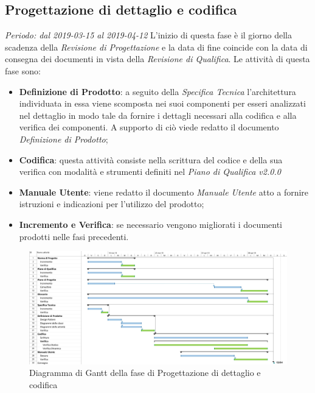 \subsection{Progettazione di dettaglio e codifica}
\textit{Periodo: dal 2019-03-15 al 2019-04-12}
L'inizio di questa fase è il giorno della scadenza della \textit{Revisione di 
Progettazione} e la data di fine coincide con la data di consegna dei documenti 
in vista della \textit{Revisione di Qualifica}. Le attività di questa fase sono:
\begin{itemize}
	\item \textbf{Definizione di Prodotto}: a seguito della \textit{Specifica 
	Tecnica} l'architettura individuata in essa viene scomposta nei suoi 
	componenti per esseri analizzati nel dettaglio in modo tale da fornire i 
	dettagli necessari alla codifica e alla verifica dei componenti. A supporto 
	di ciò viede redatto il documento \textit{Definizione di Prodotto};
	\item \textbf{Codifica}: questa attività consiste nella scrittura del 
	codice e della sua verifica con modalità e strumenti definiti nel 
	\textit{Piano di Qualifica v2.0.0}
	\item \textbf{Manuale Utente}: viene redatto il documento \textit{Manuale 
	Utente} atto a fornire istruzioni e indicazioni per l'utilizzo del prodotto;
	\item \textbf{Incremento e Verifica}: se necessario vengono migliorati i 
	documenti prodotti nelle fasi precedenti.
\end{itemize}


\begin{figure}[H]
	\includegraphics[width=0.99\linewidth]{res/images/gantt_pd.jpg}
	\caption{Diagramma di Gantt della fase di Progettazione di dettaglio e codifica}
\end{figure}


